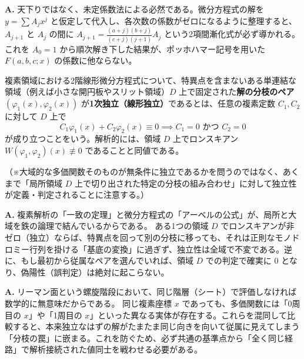 \begin{Q}
\textbf{A.} 天下りではなく、未定係数法による必然である。微分方程式の解を $y = \sum A_j x^j$ と仮定して代入し、各次数の係数がゼロになるように整理すると、$A_{j+1}$ と $A_j$ の間に $A_{j+1} = \frac{(a+j)(b+j)}{(c+j)(j+1)}A_j$ という2項間漸化式が必ず導かれる。これを $A_0 = 1$ から順次解き下した結果が、ポッホハマー記号を用いた $F(a,b,c;x)$ の係数に他ならない。
\end{Q}
\begin{definition}\label{def:linear_independence_complex}
    複素領域における2階線形微分方程式について、特異点を含まないある単連結な領域（例えば小さな開円板やスリット領域）$D$ 上で固定された\textbf{解の分枝のペア $(\varphi_1(x), \varphi_2(x))$} が\textbf{1次独立（線形独立）}であるとは、任意の複素定数 $C_1, C_2$ に対して $D$ 上で
    \[ 
    C_1\varphi_1(x) + C_2\varphi_2(x) \equiv 0 \implies C_1 = 0 \text{ かつ } C_2 = 0 
    \]
    が成り立つことをいう。解析的には、領域 $D$ 上でロンスキアン $W(\varphi_1, \varphi_2)(x) \not\equiv 0$ であることと同値である。
    
    （※大域的な多価関数そのものが無条件に独立であるかを問うのではなく、あくまで「局所領域 $D$ 上で切り出された特定の分枝の組み合わせ」に対して独立性が定義・判定されることに注意する。）
\end{definition}

\begin{Q}
\textbf{A.} 複素解析の「一致の定理」と微分方程式の「アーベルの公式」が、局所と大域を鉄の論理で結んでいるからである。
ある1つの領域 $D$ でロンスキアンが非ゼロ（独立）ならば、特異点を回って別の分枝に移っても、それは正則なモノドロミー行列を掛ける「基底の変換」に過ぎず、独立性は全域で不変である。逆に、もし最初から従属なペアを選んでいれば、領域 $D$ での判定で確実に $0$ となり、偽陽性（誤判定）は絶対に起こらない。
\end{Q}

\begin{Q}
\textbf{A.} リーマン面という螺旋階段において、同じ階層（シート）で評価しなければ数学的に無意味だからである。
同じ複素座標 $x$ であっても、多価関数には「0周目の $x$」や「1周目の $x$」といった異なる実体が存在する。これらを混同して比較すると、本来独立なはずの解がたまたま同じ向きを向いて従属に見えてしまう「分枝の罠」に嵌まる。これを防ぐため、必ず共通の基準点から「全く同じ経路」で解析接続された値同士を戦わせる必要がある。
\end{Q}

